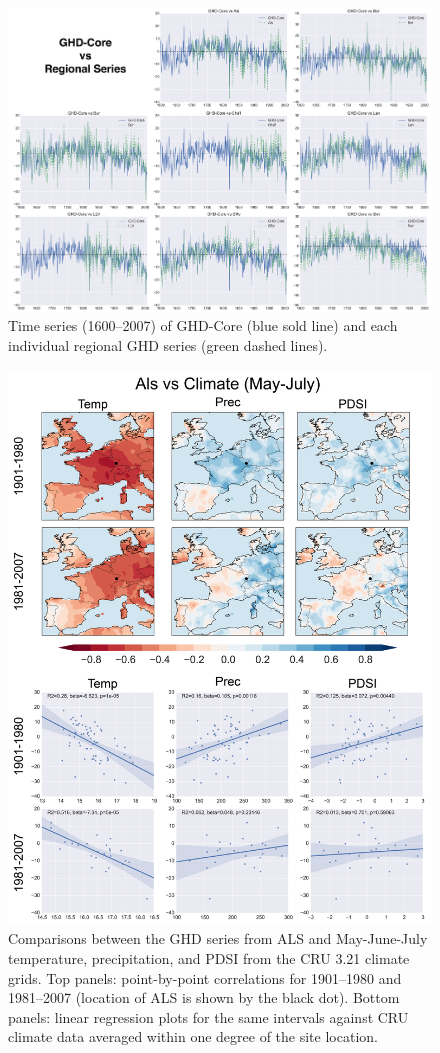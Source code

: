 \documentclass[12pt]{article}
\begin{document}
\begin{figure}
\center
\includegraphics[width=1.0\columnwidth,scale=2]{SUPP_fig_03_core_vs_sites.png}
\caption{Time series (1600--2007) of GHD-Core (blue sold line) and each individual regional GHD series (green dashed lines).}
\end{figure}

\begin{figure}
\center
\includegraphics[width=.9\columnwidth,scale=2]{SUPP_fig_04_ALS_MJJ_climate.png}
\caption{Comparisons between the GHD series from ALS and May-June-July temperature, precipitation, and PDSI from the CRU 3.21 climate grids. Top panels: point-by-point correlations for 1901--1980 and 1981--2007 (location of ALS is shown by the black dot). Bottom panels: linear regression plots for the same intervals against CRU climate data averaged within one degree of the site location.}
\end{figure}
\end{document}
